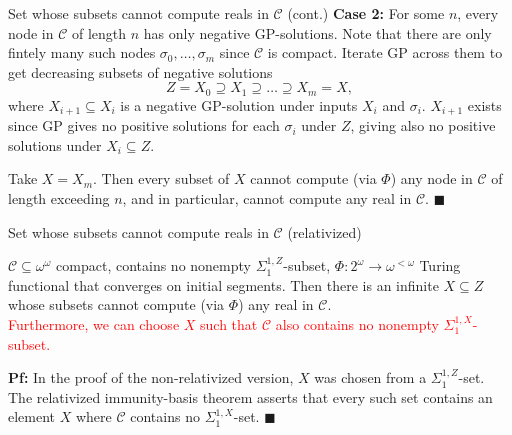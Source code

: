 \begin{frame}{Set whose subsets cannot compute reals in $\mathcal{C}$
(cont.)}
  \textbf{Case 2:} For some $n$, every node in $\mathcal{C}$ of length
  $n$ has only negative GP-solutions. Note that there are only fintely many
  such nodes $\sigma_0,\ldots,\sigma_m$ since $\mathcal{C}$ is compact.
  Iterate GP across them to get decreasing subsets of negative solutions
  \[Z=X_0 \supseteq X_1 \supseteq \ldots\supseteq X_m=X,\]
  where $X_{i+1}\subseteq X_i$ is a negative GP-solution under inputs
  $X_i$ and $\sigma_i$. $X_{i+1}$ exists since GP gives no positive
  solutions for each $\sigma_i$ under $Z$, giving also no positive
  solutions under $X_i\subseteq Z$.
  
  \vspace{1em}
  Take $X=X_m$. Then every subset of $X$ cannot compute (via $\Phi$) any
  node in $\mathcal{C}$ of length exceeding $n$, and in particular,
  cannot compute any real in $\mathcal{C}$. $\blacksquare$
\end{frame}

\begin{frame}{Set whose subsets cannot compute reals in $\mathcal{C}$
(relativized)}
  \begin{main-lemma*}[\textcolor{red}{Relativized}]
    $\mathcal{C}\subseteq\omega^\omega$ compact, contains no nonempty
    $\Sigma_1^{1,Z}$-subset, $\Phi:2^{\omega}\rightarrow \omega^{<\omega}$
    Turing functional that converges on initial segments. Then there is an
    infinite $X\subseteq Z$ whose subsets cannot compute (via $\Phi$) any
    real in $\mathcal{C}$.\\
    \vspace{0.5em}
    \textcolor{red}{Furthermore, we can choose $X$ such that $\mathcal{C}$
    also contains no nonempty $\Sigma_1^{1,X}$-subset.}
  \end{main-lemma*}

  \vspace{1em}
  \textbf{Pf:} In the proof of the non-relativized version, $X$ was chosen
  from a $\Sigma_1^{1,Z}$-set. The relativized immunity-basis theorem
  asserts that every such set contains an element $X$ where $\mathcal{C}$
  contains no $\Sigma_1^{1,X}$-set. $\blacksquare$
\end{frame}

